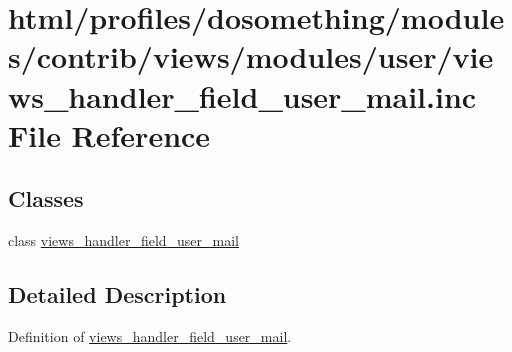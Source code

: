 \hypertarget{views__handler__field__user__mail_8inc}{
\section{html/profiles/dosomething/modules/contrib/views/modules/user/views\_\-handler\_\-field\_\-user\_\-mail.inc File Reference}
\label{views__handler__field__user__mail_8inc}
}
\subsection*{Classes}
\begin{DoxyCompactItemize}
\item 
class \hyperlink{classviews__handler__field__user__mail}{views\_\-handler\_\-field\_\-user\_\-mail}
\end{DoxyCompactItemize}


\subsection{Detailed Description}
Definition of \hyperlink{classviews__handler__field__user__mail}{views\_\-handler\_\-field\_\-user\_\-mail}. 